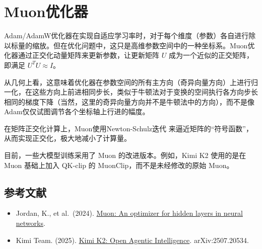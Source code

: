 \setcounter{section}{5}

\hypertarget{muonux4f18ux5316ux5668}{%
\section{Muon优化器}\label{muonux4f18ux5316ux5668}}

Adam/AdamW优化器在实现自适应学习率时，对于每个维度（参数）各自进行除以标量的缩放。但在优化问题中，这只是高维参数空间中的一种坐标系。Muon优化器通过正交化动量矩阵来更新参数，让更新矩阵 \(U\) 成为一个近似的正交矩阵，即满足 \(U^{T}U\approx I\)。

从几何上看，这意味着优化器在参数空间的所有主方向（奇异向量方向）上进行归一化，在这些方向上前进相同步长，类似于牛顿法对于变换的空间执行各方向步长相同的梯度下降（当然，这里的奇异向量方向并不是牛顿法中的方向），而不是像Adam仅仅试图调节各个坐标轴上行进的幅度。

在矩阵正交化计算上，Muon使用Newton-Schulz迭代 来逼近矩阵的``符号函数''，从而实现正交化，极大地减小了计算量。

目前，一些大模型训练采用了 Muon 的改进版本。例如，Kimi K2 使用的是在 Muon 基础上加入 QK-clip 的 MuonClip，而不是未经修改的原始 Muon。

\FloatBarrier
{}
\hypertarget{ux53c2ux8003ux6587ux732e-30}{%
\subsection{参考文献}\label{ux53c2ux8003ux6587ux732e-30}}

\vspace{0.25em}
\begin{itemize}
\tightlist
\item
  Jordan, K., et al.~(2024). \href{https://kellerjordan.github.io/posts/muon/}{Muon: An optimizer for hidden layers in neural networks}.
\item
  Kimi Team. (2025). \href{https://arxiv.org/abs/2507.20534}{Kimi K2: Open Agentic Intelligence}. arXiv:2507.20534.
\end{itemize}

\clearpage
